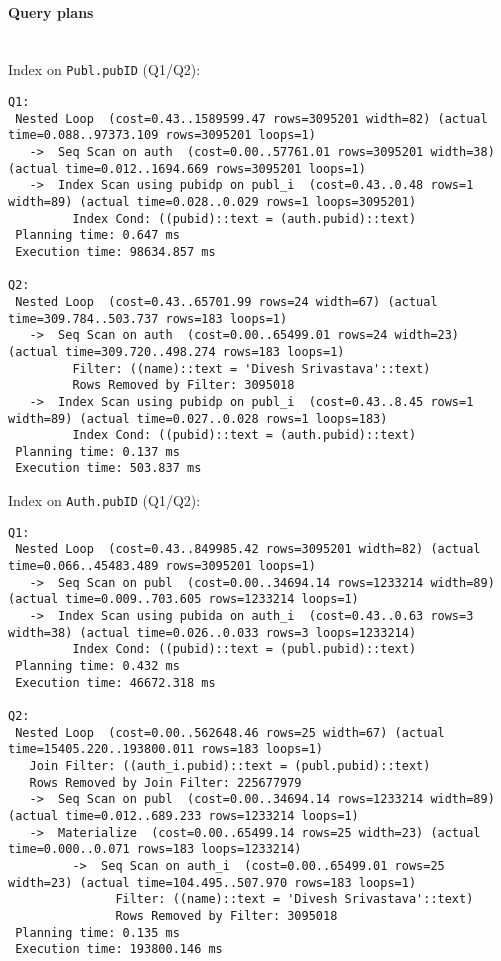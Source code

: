 \documentclass[11pt]{scrartcl}
\begin{document}
\paragraph{Query plans}\mbox{}\\ 

\noindent Index on {\tt Publ.pubID} (Q1/Q2):
{\small
\begin{verbatim}
Q1:
 Nested Loop  (cost=0.43..1589599.47 rows=3095201 width=82) (actual time=0.088..97373.109 rows=3095201 loops=1)
   ->  Seq Scan on auth  (cost=0.00..57761.01 rows=3095201 width=38) (actual time=0.012..1694.669 rows=3095201 loops=1)
   ->  Index Scan using pubidp on publ_i  (cost=0.43..0.48 rows=1 width=89) (actual time=0.028..0.029 rows=1 loops=3095201)
         Index Cond: ((pubid)::text = (auth.pubid)::text)
 Planning time: 0.647 ms
 Execution time: 98634.857 ms

Q2:
 Nested Loop  (cost=0.43..65701.99 rows=24 width=67) (actual time=309.784..503.737 rows=183 loops=1)
   ->  Seq Scan on auth  (cost=0.00..65499.01 rows=24 width=23) (actual time=309.720..498.274 rows=183 loops=1)
         Filter: ((name)::text = 'Divesh Srivastava'::text)
         Rows Removed by Filter: 3095018
   ->  Index Scan using pubidp on publ_i  (cost=0.43..8.45 rows=1 width=89) (actual time=0.027..0.028 rows=1 loops=183)
         Index Cond: ((pubid)::text = (auth.pubid)::text)
 Planning time: 0.137 ms
 Execution time: 503.837 ms
\end{verbatim}
}

\noindent Index on {\tt Auth.pubID} (Q1/Q2):
{\small
\begin{verbatim}
Q1:
 Nested Loop  (cost=0.43..849985.42 rows=3095201 width=82) (actual time=0.066..45483.489 rows=3095201 loops=1)
   ->  Seq Scan on publ  (cost=0.00..34694.14 rows=1233214 width=89) (actual time=0.009..703.605 rows=1233214 loops=1)
   ->  Index Scan using pubida on auth_i  (cost=0.43..0.63 rows=3 width=38) (actual time=0.026..0.033 rows=3 loops=1233214)
         Index Cond: ((pubid)::text = (publ.pubid)::text)
 Planning time: 0.432 ms
 Execution time: 46672.318 ms

Q2:
 Nested Loop  (cost=0.00..562648.46 rows=25 width=67) (actual time=15405.220..193800.011 rows=183 loops=1)
   Join Filter: ((auth_i.pubid)::text = (publ.pubid)::text)
   Rows Removed by Join Filter: 225677979
   ->  Seq Scan on publ  (cost=0.00..34694.14 rows=1233214 width=89) (actual time=0.012..689.233 rows=1233214 loops=1)
   ->  Materialize  (cost=0.00..65499.14 rows=25 width=23) (actual time=0.000..0.071 rows=183 loops=1233214)
         ->  Seq Scan on auth_i  (cost=0.00..65499.01 rows=25 width=23) (actual time=104.495..507.970 rows=183 loops=1)
               Filter: ((name)::text = 'Divesh Srivastava'::text)
               Rows Removed by Filter: 3095018
 Planning time: 0.135 ms
 Execution time: 193800.146 ms
\end{verbatim}
}
\end{document}
